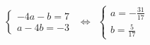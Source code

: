 \begin{equation}
\left\{\begin{array}{l}
-4a-b=7 \\
a-4b =-3
\end{array}
\right.    ~~\Leftrightarrow~~
\left\{\begin{array}{l}
a=-\frac{31}{17} \\
b=\frac{5}{17}
\end{array}
\right.
\end{equation}
